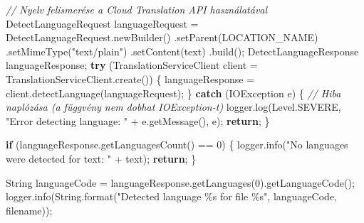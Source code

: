 \documentclass[
]{article}
\newenvironment{Shaded}{}{}
\newcommand{\BuiltInTok}[1]{\textcolor[rgb]{0.00,0.50,0.00}{#1}}
\newcommand{\CommentTok}[1]{\textcolor[rgb]{0.38,0.63,0.69}{\textit{#1}}}
\newcommand{\ControlFlowTok}[1]{\textcolor[rgb]{0.00,0.44,0.13}{\textbf{#1}}}
\newcommand{\DecValTok}[1]{\textcolor[rgb]{0.25,0.63,0.44}{#1}}
\newcommand{\FunctionTok}[1]{\textcolor[rgb]{0.02,0.16,0.49}{#1}}
\newcommand{\NormalTok}[1]{#1}
\newcommand{\OperatorTok}[1]{\textcolor[rgb]{0.40,0.40,0.40}{#1}}
\newcommand{\SpecialCharTok}[1]{\textcolor[rgb]{0.25,0.44,0.63}{#1}}
\newcommand{\StringTok}[1]{\textcolor[rgb]{0.25,0.44,0.63}{#1}}
\begin{document}
\begin{Shaded}
\begin{Highlighting}[]
    \CommentTok{// Nyelv felismerése a Cloud Translation API használatával}
\NormalTok{    DetectLanguageRequest languageRequest }\OperatorTok{=}
\NormalTok{        DetectLanguageRequest}\OperatorTok{.}\FunctionTok{newBuilder}\OperatorTok{()}
            \OperatorTok{.}\FunctionTok{setParent}\OperatorTok{(}\NormalTok{LOCATION\_NAME}\OperatorTok{)}
            \OperatorTok{.}\FunctionTok{setMimeType}\OperatorTok{(}\StringTok{"text/plain"}\OperatorTok{)}
            \OperatorTok{.}\FunctionTok{setContent}\OperatorTok{(}\NormalTok{text}\OperatorTok{)}
            \OperatorTok{.}\FunctionTok{build}\OperatorTok{();}
\NormalTok{    DetectLanguageResponse languageResponse}\OperatorTok{;}
    \ControlFlowTok{try} \OperatorTok{(}\NormalTok{TranslationServiceClient client }\OperatorTok{=}\NormalTok{ TranslationServiceClient}\OperatorTok{.}\FunctionTok{create}\OperatorTok{())} \OperatorTok{\{}
\NormalTok{      languageResponse }\OperatorTok{=}\NormalTok{ client}\OperatorTok{.}\FunctionTok{detectLanguage}\OperatorTok{(}\NormalTok{languageRequest}\OperatorTok{);}
    \OperatorTok{\}} \ControlFlowTok{catch} \OperatorTok{(}\BuiltInTok{IOException}\NormalTok{ e}\OperatorTok{)} \OperatorTok{\{}
      \CommentTok{// Hiba naplózása (a függvény nem dobhat IOException{-}t)}
\NormalTok{      logger}\OperatorTok{.}\FunctionTok{log}\OperatorTok{(}\BuiltInTok{Level}\OperatorTok{.}\FunctionTok{SEVERE}\OperatorTok{,} \StringTok{"Error detecting language: "} \OperatorTok{+}\NormalTok{ e}\OperatorTok{.}\FunctionTok{getMessage}\OperatorTok{(),}\NormalTok{ e}\OperatorTok{);}
      \ControlFlowTok{return}\OperatorTok{;}
    \OperatorTok{\}}

    \ControlFlowTok{if} \OperatorTok{(}\NormalTok{languageResponse}\OperatorTok{.}\FunctionTok{getLanguagesCount}\OperatorTok{()} \OperatorTok{==} \DecValTok{0}\OperatorTok{)} \OperatorTok{\{}
\NormalTok{      logger}\OperatorTok{.}\FunctionTok{info}\OperatorTok{(}\StringTok{"No languages were detected for text: "} \OperatorTok{+}\NormalTok{ text}\OperatorTok{);}
      \ControlFlowTok{return}\OperatorTok{;}
    \OperatorTok{\}}

    \BuiltInTok{String}\NormalTok{ languageCode }\OperatorTok{=}\NormalTok{ languageResponse}\OperatorTok{.}\FunctionTok{getLanguages}\OperatorTok{(}\DecValTok{0}\OperatorTok{).}\FunctionTok{getLanguageCode}\OperatorTok{();}
\NormalTok{    logger}\OperatorTok{.}\FunctionTok{info}\OperatorTok{(}\BuiltInTok{String}\OperatorTok{.}\FunctionTok{format}\OperatorTok{(}\StringTok{"Detected language }\SpecialCharTok{\%s}\StringTok{ for file }\SpecialCharTok{\%s}\StringTok{"}\OperatorTok{,}\NormalTok{ languageCode}\OperatorTok{,}\NormalTok{ filename}\OperatorTok{));}


\end{Highlighting}
\end{Shaded}
\end{document}
